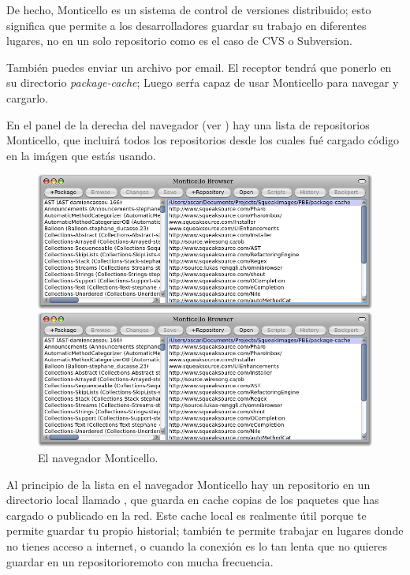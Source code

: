 \documentclass[a4paper,10pt,twoside]{book}
\begin{document}
De hecho, Monticello es un sistema de control de versiones distribuido; esto significa que permite a los desarrolladores guardar su trabajo en diferentes lugares, no en un solo repositorio como es el caso de CVS o Subversion. 
 

Tambi\'en puedes enviar un archivo  por email.
El receptor tendr\'a que ponerlo en su directorio \emph{package-cache}; Luego ser\'ra capaz de usar Monticello para navegar y cargarlo.

En el panel de la derecha del navegador (ver ) hay una lista de repositorios Monticello, que incluir\'a todos los repositorios desde los cuales fu\'e cargado c\'odigo en la im\'agen que est\'as usando.

\begin{figure}[hbt]
\ifluluelse
	{\centerline {\includegraphics[width=\textwidth]{MonticelloBrowser}}}
	{\centerline {\includegraphics[scale=0.7]{MonticelloBrowser}}}
\caption{El navegador Monticello.
}
\end{figure}

Al principio de la lista en el navegador Monticello hay un repositorio en un directorio local llamado , que guarda en cache copias de los paquetes que has cargado o publicado en la red. Este cache local es realmente \'util porque te permite guardar tu propio historial; tambi\'en te permite trabajar en lugares donde no tienes acceso a internet, o cuando la conexi\'on es lo tan lenta que no quieres guardar en un repositorioremoto con mucha frecuencia. 
\end{document}
